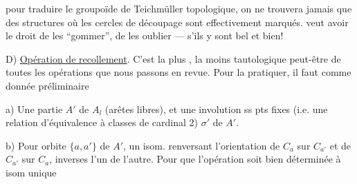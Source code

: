 
pour  traduire le groupoïde de Teichmüller topologique, on ne trouvera jamais que des structures où les cercles de découpage sont effectivement marqués.
 veut avoir le droit de les ``gommer'', de les oublier  ---  s'ils y sont bel et bien!

D) \uline{Opération de recollement}. C'est la plus , la moins tautologique peut-être de toutes les opérations que nous passons en revue.
Pour la pratiquer, il faut comme donnée préliminaire

a) Une partie  $A'$ de $A_l$ (arêtes libres), et une involution ss pts fixes (i.e. une relation d'équivalence à classes de cardinal 2) $\sigma'$ de  $A'$.

b) Pour   orbite  $\{a,a'\}$ de $A'$, un isom. renversant l'orientation de $C_a$ sur $C_{a'}$ et de $C_{a'}$ sur $C_a$, inverses l'un de l'autre.
Pour que l'opération soit bien déterminée à isom unique
